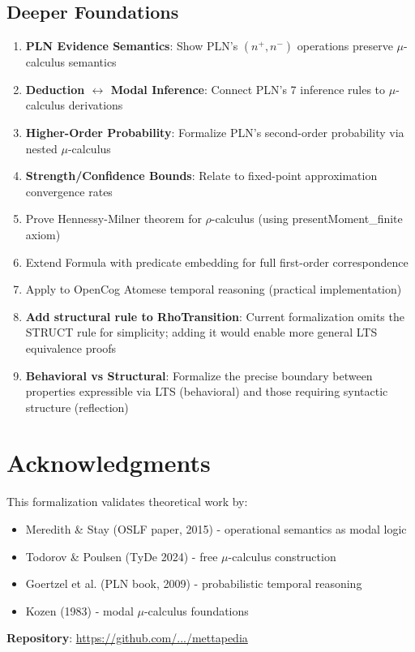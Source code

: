 \documentclass[11pt]{article}
\begin{document}
\subsection{Deeper Foundations}
\begin{enumerate}
\item \textbf{PLN Evidence Semantics}: Show PLN's $(n^+, n^-)$ operations preserve $\mu$-calculus semantics
\item \textbf{Deduction $\leftrightarrow$ Modal Inference}: Connect PLN's 7 inference rules to $\mu$-calculus derivations
\item \textbf{Higher-Order Probability}: Formalize PLN's second-order probability via nested $\mu$-calculus
\item \textbf{Strength/Confidence Bounds}: Relate to fixed-point approximation convergence rates
\item Prove Hennessy-Milner theorem for $\rho$-calculus (using presentMoment\_finite axiom)
\item Extend Formula with predicate embedding for full first-order correspondence
\item Apply to OpenCog Atomese temporal reasoning (practical implementation)
\item \textbf{Add structural rule to RhoTransition}: Current formalization omits the STRUCT rule for simplicity; adding it would enable more general LTS equivalence proofs
\item \textbf{Behavioral vs Structural}: Formalize the precise boundary between properties expressible via LTS (behavioral) and those requiring syntactic structure (reflection)
\end{enumerate}

\section*{Acknowledgments}

This formalization validates theoretical work by:
\begin{itemize}
\item Meredith \& Stay (OSLF paper, 2015) - operational semantics as modal logic
\item Todorov \& Poulsen (TyDe 2024) - free $\mu$-calculus construction
\item Goertzel et al. (PLN book, 2009) - probabilistic temporal reasoning
\item Kozen (1983) - modal $\mu$-calculus foundations
\end{itemize}

\textbf{Repository}: \url{https://github.com/.../mettapedia}
\end{document}
